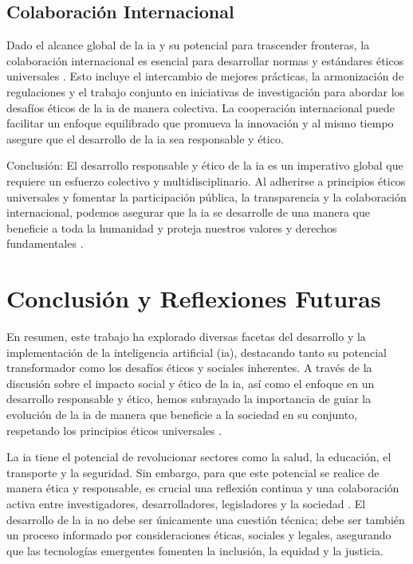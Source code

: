\subsection{Colaboración Internacional}

Dado el alcance global de la \acrshort{ia} y su potencial para trascender fronteras, la colaboración internacional es esencial para desarrollar normas y estándares éticos universales \cite{Kumar2024}. Esto incluye el intercambio de mejores prácticas, la armonización de regulaciones y el trabajo conjunto en iniciativas de investigación para abordar los desafíos éticos de la \acrshort{ia} de manera colectiva. La cooperación internacional puede facilitar un enfoque equilibrado que promueva la innovación y al mismo tiempo asegure que el desarrollo de la \acrshort{ia} sea responsable y ético.

Conclusión: El desarrollo responsable y ético de la \acrshort{ia} es un imperativo global que requiere un esfuerzo colectivo y multidisciplinario. Al adherirse a principios éticos universales y fomentar la participación pública, la transparencia y la colaboración internacional, podemos asegurar que la \acrshort{ia} se desarrolle de una manera que beneficie a toda la humanidad y proteja nuestros valores y derechos fundamentales \cite{Hernandez2024}.

\section{Conclusión y Reflexiones Futuras}

En resumen, este trabajo ha explorado diversas facetas del desarrollo y la implementación de la inteligencia artificial (\acrshort{ia}), destacando tanto su potencial transformador como los desafíos éticos y sociales inherentes. A través de la discusión sobre el impacto social y ético de la \acrshort{ia}, así como el enfoque en un desarrollo responsable y ético, hemos subrayado la importancia de guiar la evolución de la \acrshort{ia} de manera que beneficie a la sociedad en su conjunto, respetando los principios éticos universales \cite{Hernandez2024}.

La \acrshort{ia} tiene el potencial de revolucionar sectores como la salud, la educación, el transporte y la seguridad. Sin embargo, para que este potencial se realice de manera ética y responsable, es crucial una reflexión continua y una colaboración activa entre investigadores, desarrolladores, legisladores y la sociedad \cite{Williams2022}. El desarrollo de la \acrshort{ia} no debe ser únicamente una cuestión técnica; debe ser también un proceso informado por consideraciones éticas, sociales y legales, asegurando que las tecnologías emergentes fomenten la inclusión, la equidad y la justicia.

